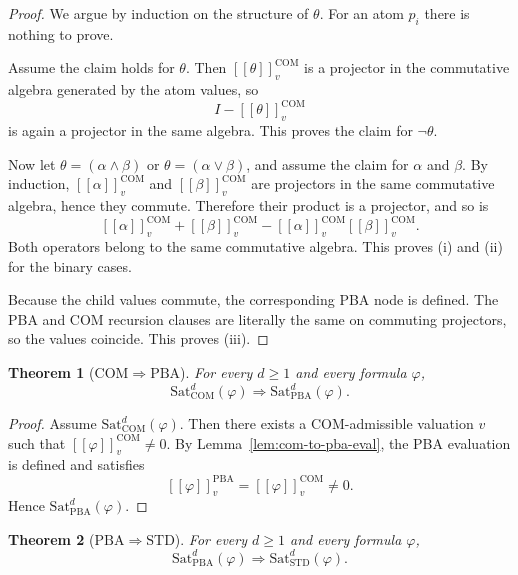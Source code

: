 \documentclass[11pt]{article}
\theoremstyle{plain}
\newtheorem{theorem}{Theorem}[section]
\theoremstyle{definition}
\newcommand{\STD}{\mathrm{STD}}
\newcommand{\COM}{\mathrm{COM}}
\newcommand{\PBA}{\mathrm{PBA}}
\newcommand{\Sat}{\mathrm{Sat}}
\newcommand{\sem}[1]{\left[\!\left[#1\right]\!\right]}
\begin{document}
\begin{proof}
We argue by induction on the structure of $\theta$.
For an atom $p_i$ there is nothing to prove.

Assume the claim holds for $\theta$.
Then $\sem{\theta}^{\COM}_v$ is a projector in the commutative algebra generated by the atom values, so
\[
I-\sem{\theta}^{\COM}_v
\]
is again a projector in the same algebra.
This proves the claim for $\neg\theta$.

Now let $\theta=(\alpha\wedge\beta)$ or $\theta=(\alpha\vee\beta)$, and assume the claim for $\alpha$ and $\beta$.
By induction, $\sem{\alpha}^{\COM}_v$ and $\sem{\beta}^{\COM}_v$ are projectors in the same commutative algebra, hence they commute.
Therefore their product is a projector, and so is
\[
\sem{\alpha}^{\COM}_v + \sem{\beta}^{\COM}_v - \sem{\alpha}^{\COM}_v\sem{\beta}^{\COM}_v.
\]
Both operators belong to the same commutative algebra.
This proves (i) and (ii) for the binary cases.

Because the child values commute, the corresponding PBA node is defined.
The PBA and COM recursion clauses are literally the same on commuting projectors, so the values coincide.
This proves (iii).
\end{proof}

\begin{theorem}[\(\COM\Rightarrow\PBA\)]\label{thm:com-implies-pba}
For every $d\geq 1$ and every formula $\varphi$,
\[
\Sat_{\COM}^d(\varphi) \Longrightarrow \Sat_{\PBA}^d(\varphi).
\]
\end{theorem}

\begin{proof}
Assume $\Sat_{\COM}^d(\varphi)$.
Then there exists a COM-admissible valuation $v$ such that $\sem{\varphi}^{\COM}_v\neq 0$.
By Lemma~\ref{lem:com-to-pba-eval}, the PBA evaluation is defined and satisfies
\[
\sem{\varphi}^{\PBA}_v = \sem{\varphi}^{\COM}_v \neq 0.
\]
Hence $\Sat_{\PBA}^d(\varphi)$.
\end{proof}

\begin{theorem}[\(\PBA\Rightarrow\STD\)]\label{thm:pba-implies-std}
For every $d\geq 1$ and every formula $\varphi$,
\[
\Sat_{\PBA}^d(\varphi) \Longrightarrow \Sat_{\STD}^d(\varphi).
\]
\end{theorem}
\end{document}
